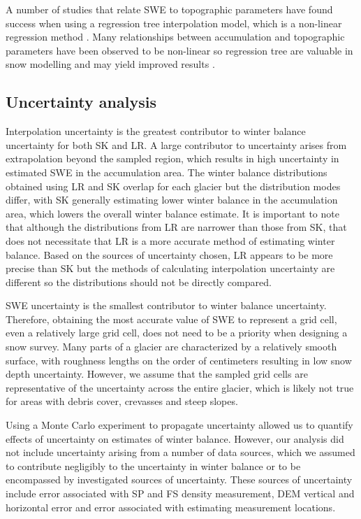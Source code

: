 \documentclass[review,oneside, letterpaper]{igs}
\begin{document}
A number of studies that relate SWE to topographic parameters have found success when using a regression tree interpolation model, which is a non-linear regression method \citep[e.g.][]{Elder1998, Erickson2005, Lopez2010}. Many relationships between accumulation and topographic parameters have been observed to be non-linear so regression tree are valuable in snow modelling and may yield improved results \citep{Erxleben2002, Molotch2005}. 

\subsection{Uncertainty analysis}

Interpolation uncertainty is the greatest contributor to winter balance uncertainty for both SK and LR. A large contributor to uncertainty arises from extrapolation beyond the sampled region, which results in high uncertainty in estimated SWE in the accumulation area. The winter balance distributions obtained using LR and SK overlap for each glacier but the distribution modes differ, with SK generally estimating lower winter balance in the accumulation area, which lowers the overall winter balance estimate. It is important to note that although the distributions from LR are narrower than those from SK, that does not necessitate that LR is a more accurate method of estimating winter balance. Based on the sources of uncertainty chosen, LR appears to be more precise than SK but the methods of calculating interpolation uncertainty are different so the distributions should not be directly compared. 

SWE uncertainty is the smallest contributor to winter balance uncertainty. Therefore, obtaining the most accurate value of SWE to represent a grid cell, even a relatively large grid cell, does not need to be a priority when designing a snow survey. Many parts of a glacier are characterized by a relatively smooth surface, with roughness lengths on the order of centimeters \citep{Hock2005} resulting in low snow depth uncertainty. However, we assume that the sampled grid cells are representative of the uncertainty across the entire glacier, which is likely not true for areas with debris cover, crevasses and steep slopes. 

Using a Monte Carlo experiment to propagate uncertainty allowed us to quantify effects of uncertainty on estimates of winter balance. However, our analysis did not include uncertainty arising from a number of data sources, which we assumed to contribute negligibly to the uncertainty in winter balance or to be encompassed by investigated sources of uncertainty. These sources of uncertainty include error associated with SP and FS density measurement, DEM vertical and horizontal error and error associated with estimating measurement locations.
\end{document}
